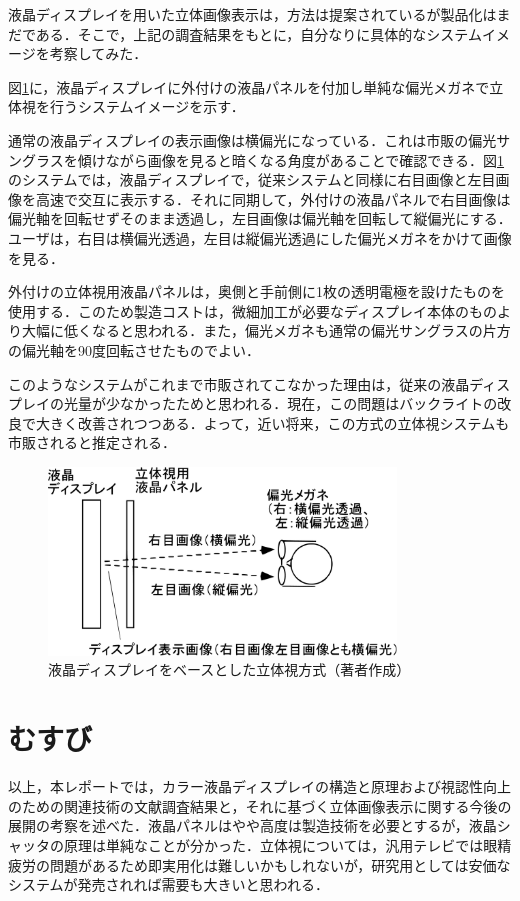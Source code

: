 \documentclass[dvipdfmx,uplatex]{jsarticle}
\begin{document}
液晶ディスプレイを用いた立体画像表示は，方法は提案されているが製品化はまだである．そこで，上記の調査結果をもとに，自分なりに具体的なシステムイメージを考察してみた．

図\ref{FIG.SS}に，液晶ディスプレイに外付けの液晶パネルを付加し単純な偏光メガネで立体視を行うシステムイメージを示す．

通常の液晶ディスプレイの表示画像は横偏光になっている．これは市販の偏光サングラスを傾けながら画像を見ると暗くなる角度があることで確認できる．図\ref{FIG.SS}のシステムでは，液晶ディスプレイで，従来システムと同様に右目画像と左目画像を高速で交互に表示する．それに同期して，外付けの液晶パネルで右目画像は偏光軸を回転せずそのまま透過し，左目画像は偏光軸を回転して縦偏光にする．ユーザは，右目は横偏光透過，左目は縦偏光透過にした偏光メガネをかけて画像を見る．

外付けの立体視用液晶パネルは，奥側と手前側に1枚の透明電極を設けたものを使用する．このため製造コストは，微細加工が必要なディスプレイ本体のものより大幅に低くなると思われる．また，偏光メガネも通常の偏光サングラスの片方の偏光軸を90度回転させたものでよい．

このようなシステムがこれまで市販されてこなかった理由は，従来の液晶ディスプレイの光量が少なかったためと思われる．現在，この問題はバックライトの改良で大きく改善されつつある．よって，近い将来，この方式の立体視システムも市販されると推定される．

\begin{figure}[ht]
	\centering
	\includegraphics[height=5cm]{fig/RC1grt.pdf}
	\caption{液晶ディスプレイをベースとした立体視方式（著者作成）}\label{FIG.SS}
\end{figure}

\section{むすび}\label{SEC.CONC}
以上，本レポートでは，カラー液晶ディスプレイの構造と原理および視認性向上のための関連技術の文献調査結果と，それに基づく立体画像表示に関する今後の展開の考察を述べた．液晶パネルはやや高度は製造技術を必要とするが，液晶シャッタの原理は単純なことが分かった．立体視については，汎用テレビでは眼精疲労の問題があるため即実用化は難しいかもしれないが，研究用としては安価なシステムが発売されれば需要も大きいと思われる．
\end{document}
